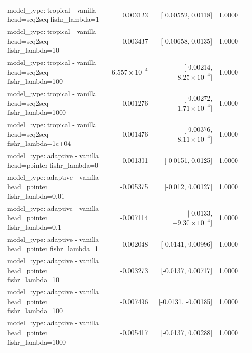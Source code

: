 \documentclass[10pt]{article}
\makeatletter
\newcommand{\stackcell}[1]{\begin{tabular}[t]{@{}l@{}}#1\end{tabular}}
\makeatother
\begin{document}
{\begin{longtable}{lrrrl}
\stackcell{model\_type: tropical - vanilla\\\footnotesize head=seq2seq fishr\_lambda=1 } & 0.003123 & [-0.00552, 0.0118] & 1.0000 & \\
\stackcell{model\_type: tropical - vanilla\\\footnotesize head=seq2seq fishr\_lambda=10 } & 0.003437 & [-0.00658, 0.0135] & 1.0000 & \\
\stackcell{model\_type: tropical - vanilla\\\footnotesize head=seq2seq fishr\_lambda=100 } & $-6.557\times10^{-4}$ & [-0.00214, $8.25\times10^{-4}$] & 1.0000 & \\
\stackcell{model\_type: tropical - vanilla\\\footnotesize head=seq2seq fishr\_lambda=1000 } & -0.001276 & [-0.00272, $1.71\times10^{-4}$] & 1.0000 & \\
\stackcell{model\_type: tropical - vanilla\\\footnotesize head=seq2seq fishr\_lambda=1e+04 } & -0.001476 & [-0.00376, $8.11\times10^{-4}$] & 1.0000 & \\
\stackcell{model\_type: adaptive - vanilla\\\footnotesize head=pointer fishr\_lambda=0 } & -0.001301 & [-0.0151, 0.0125] & 1.0000 & \\
\stackcell{model\_type: adaptive - vanilla\\\footnotesize head=pointer fishr\_lambda=0.01 } & -0.005375 & [-0.012, 0.00127] & 1.0000 & \\
\stackcell{model\_type: adaptive - vanilla\\\footnotesize head=pointer fishr\_lambda=0.1 } & -0.007114 & [-0.0133, $-9.30\times10^{-4}$] & 1.0000 & \\
\stackcell{model\_type: adaptive - vanilla\\\footnotesize head=pointer fishr\_lambda=1 } & -0.002048 & [-0.0141, 0.00996] & 1.0000 & \\
\stackcell{model\_type: adaptive - vanilla\\\footnotesize head=pointer fishr\_lambda=10 } & -0.003273 & [-0.0137, 0.00717] & 1.0000 & \\
\stackcell{model\_type: adaptive - vanilla\\\footnotesize head=pointer fishr\_lambda=100 } & -0.007496 & [-0.0131, -0.00185] & 1.0000 & \\
\stackcell{model\_type: adaptive - vanilla\\\footnotesize head=pointer fishr\_lambda=1000 } & -0.005417 & [-0.0137, 0.00288] & 1.0000 & \\

\end{longtable}}
\end{document}
